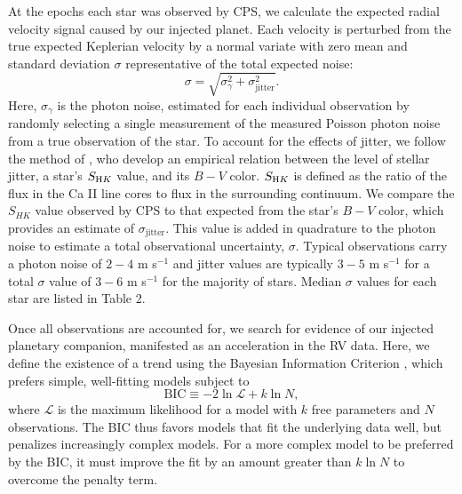 At the epochs each star was observed by CPS, we calculate the expected radial velocity signal caused by our injected planet. Each velocity is perturbed from the true expected Keplerian velocity by a normal variate with zero mean and standard deviation $\sigma$ representative of the total expected noise:
\begin{equation}
\sigma = \sqrt{\sigma_\gamma^2 + \sigma^2_\textrm{jitter}}.
\label{sigmaeq}
\end{equation}
Here, $\sigma_\gamma$ is the photon noise, estimated for each individual observation by randomly selecting a single measurement of the measured Poisson photon noise from a true observation of the star. To account for the effects of jitter, we follow the method of \citet{Isaacson10}, who develop an empirical relation between the level of stellar jitter, a star's $S_{\textrm HK}$ value, and its $B-V$ color. $S_{\textrm HK}$ is defined as the ratio of the flux in the Ca II line cores to flux in the surrounding continuum. We compare the $S_{HK}$ value observed by CPS to that expected from the star's $B-V$ color, which provides an estimate of $\sigma_\textrm{jitter}$. This value is added in quadrature to the photon noise to estimate a total observational uncertainty, $\sigma$. Typical observations carry a photon noise of $2-4$ m s$^{-1}$ and jitter values are typically $3-5$ m s$^{-1}$ for a total $\sigma$ value of $3-6$ m s$^{-1}$ for the majority of stars. Median $\sigma$ values for each star are listed in Table 2.

Once all observations are accounted for, we search for evidence of our injected planetary companion, manifested as an acceleration in the RV data. Here, we define the existence of a trend using the Bayesian Information Criterion \citep[BIC;][]{Schwarz78, Bowler10, Campo11, Stevenson12}, which prefers simple, well-fitting models subject to 
\begin{equation}
\textrm{BIC} \equiv -2 \ln \mathcal{L} + k \ln N,
\label{EqBIC}
\end{equation}  
where $\mathcal{L}$ is the maximum likelihood for a model with $k$ free parameters and $N$ observations. The BIC thus favors models that fit the underlying data well, but penalizes increasingly complex models. For a more complex model to be preferred by the BIC, it must improve the fit by an amount greater than $k \ln N$ to overcome the penalty term.

